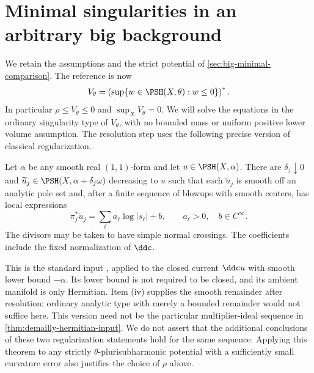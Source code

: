 \section{Minimal singularities in an arbitrary big background}
\label{sec:big-minimal-existence}

We retain the assumptions and the strict potential of \cref{sec:big-minimal-comparison}. The reference is now
\[
 V_\theta=\left(\sup\{w\in\PSH(X,\theta):w\leq0\}\right)^*.
\]
In particular $\rho\leq V_\theta\leq0$ and $\sup_XV_\theta=0$. We will solve the equations in the ordinary singularity type of $V_\theta$, with no bounded mass or uniform positive lower volume assumption. The resolution step uses the following precise version of classical regularization.

\begin{theorem}\label{thm:resolvable-regularization-input}
Let $\alpha$ be any smooth real $(1,1)$-form and let $u\in\PSH(X,\alpha)$. There are $\delta_j\downarrow0$ and $\widetilde u_j\in\PSH(X,\alpha+\delta_j\omega)$ decreasing to $u$ such that each $\widetilde u_j$ is smooth off an analytic pole set and, after a finite sequence of blowups with smooth centers, has local expressions
\[
 \pi_j^*\widetilde u_j=\sum_\ell a_\ell\log|s_\ell|+b,
 \qquad a_\ell>0,\quad b\in C^\infty.
\]
The divisors may be taken to have simple normal crossings. The coefficients include the fixed normalization of $\ddc$.
\end{theorem}

This is the standard input \cite[Theorem 3.2]{DP04}, applied to the closed current $\ddc u$ with smooth lower bound $-\alpha$. Its lower bound is not required to be closed, and its ambient manifold is only Hermitian. Item (iv) supplies the smooth remainder after resolution; ordinary analytic type with merely a bounded remainder would not suffice here. This version need not be the particular multiplier-ideal sequence in \cref{thm:demailly-hermitian-input}. We do not assert that the additional conclusions of these two regularization statements hold for the same sequence. Applying this theorem to any strictly $\theta$-plurisubharmonic potential with a sufficiently small curvature error also justifies the choice of $\rho$ above.

